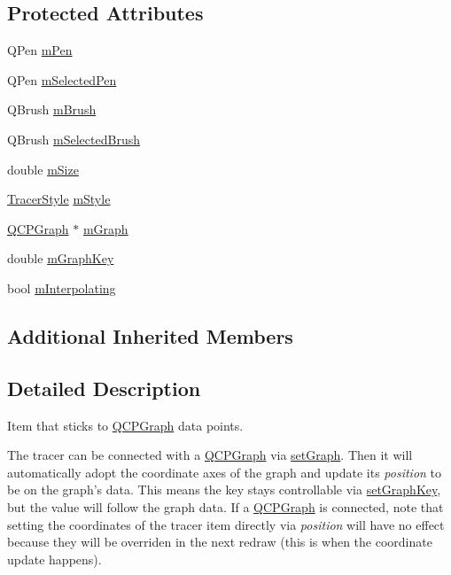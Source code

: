 \subsection*{Protected Attributes}
\begin{DoxyCompactItemize}
\item 
Q\-Pen \hyperlink{class_q_c_p_item_tracer_a579e3bd6bd16d6aaff03638dc8a99a69}{m\-Pen}
\item 
Q\-Pen \hyperlink{class_q_c_p_item_tracer_a3f61829784200819661d1e2a5354d866}{m\-Selected\-Pen}
\item 
Q\-Brush \hyperlink{class_q_c_p_item_tracer_a6597be63a17a266233941354200b2340}{m\-Brush}
\item 
Q\-Brush \hyperlink{class_q_c_p_item_tracer_a1c15d2adde40efdcc0ef1ff78fd256a6}{m\-Selected\-Brush}
\item 
double \hyperlink{class_q_c_p_item_tracer_a575153a24bb357d1e006f6bc3bd099b9}{m\-Size}
\item 
\hyperlink{class_q_c_p_item_tracer_a2f05ddb13978036f902ca3ab47076500}{Tracer\-Style} \hyperlink{class_q_c_p_item_tracer_afb1f236bebf417544e0138fef22a292e}{m\-Style}
\item 
\hyperlink{class_q_c_p_graph}{Q\-C\-P\-Graph} $\ast$ \hyperlink{class_q_c_p_item_tracer_a2d70cf616b579563aa15f796dfc143ac}{m\-Graph}
\item 
double \hyperlink{class_q_c_p_item_tracer_a8fa20f2e9ee07d21fd7c8d30ba4702ca}{m\-Graph\-Key}
\item 
bool \hyperlink{class_q_c_p_item_tracer_afab37c22ad39f235921e86f93cd84595}{m\-Interpolating}
\end{DoxyCompactItemize}
\subsection*{Additional Inherited Members}


\subsection{Detailed Description}
Item that sticks to \hyperlink{class_q_c_p_graph}{Q\-C\-P\-Graph} data points. 

 The tracer can be connected with a \hyperlink{class_q_c_p_graph}{Q\-C\-P\-Graph} via \hyperlink{class_q_c_p_item_tracer_af5886f4ded8dd68cb4f3388f390790c0}{set\-Graph}. Then it will automatically adopt the coordinate axes of the graph and update its {\itshape position} to be on the graph's data. This means the key stays controllable via \hyperlink{class_q_c_p_item_tracer_a6840143b42f3b685cedf7c6d83a704c8}{set\-Graph\-Key}, but the value will follow the graph data. If a \hyperlink{class_q_c_p_graph}{Q\-C\-P\-Graph} is connected, note that setting the coordinates of the tracer item directly via {\itshape position} will have no effect because they will be overriden in the next redraw (this is when the coordinate update happens).

